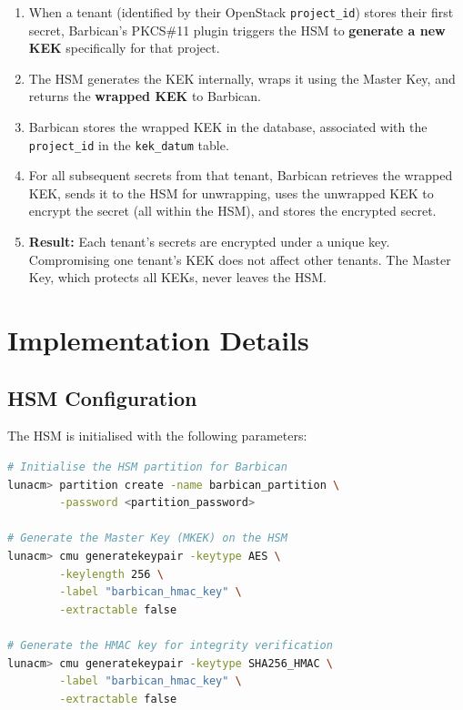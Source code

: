 \documentclass[12pt,a4paper,oneside]{report}
\begin{document}
\begin{enumerate}
    \item When a tenant (identified by their OpenStack \texttt{project\_id}) stores their first secret, Barbican's PKCS\#11 plugin triggers the HSM to \textbf{generate a new KEK} specifically for that project.
    \item The HSM generates the KEK internally, wraps it using the Master Key, and returns the \textbf{wrapped KEK} to Barbican.
    \item Barbican stores the wrapped KEK in the database, associated with the \texttt{project\_id} in the \texttt{kek\_datum} table.
    \item For all subsequent secrets from that tenant, Barbican retrieves the wrapped KEK, sends it to the HSM for unwrapping, uses the unwrapped KEK to encrypt the secret (all within the HSM), and stores the encrypted secret.
    \item \textbf{Result:} Each tenant's secrets are encrypted under a unique key. Compromising one tenant's KEK does not affect other tenants. The Master Key, which protects all KEKs, never leaves the HSM.
\end{enumerate}

\section{Implementation Details}

\subsection{HSM Configuration}

The HSM is initialised with the following parameters:

\begin{lstlisting}[language=bash, caption={HSM Initialisation (Thales Luna Example)}]
# Initialise the HSM partition for Barbican
lunacm> partition create -name barbican_partition \
        -password <partition_password>

# Generate the Master Key (MKEK) on the HSM
lunacm> cmu generatekeypair -keytype AES \
        -keylength 256 \
        -label "barbican_hmac_key" \
        -extractable false

# Generate the HMAC key for integrity verification
lunacm> cmu generatekeypair -keytype SHA256_HMAC \
        -label "barbican_hmac_key" \
        -extractable false
\end{lstlisting}
\end{document}
